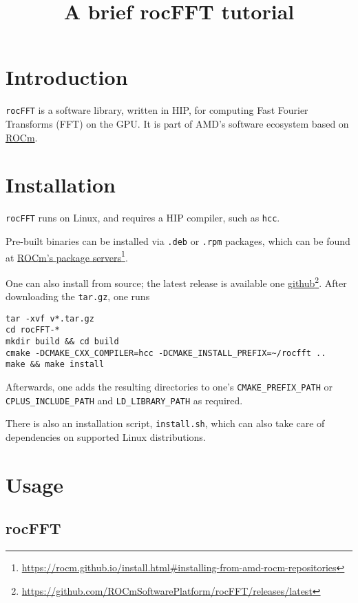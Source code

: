 \documentclass[10pt]{article}
\title{A brief rocFFT tutorial}
\date{}
\renewcommand{\(}{\left(}
\renewcommand{\)}{\right)}
\begin{document}
\maketitle

\section{Introduction}

\texttt{rocFFT} is a software library, written in HIP, for computing
Fast Fourier Transforms (FFT) on the GPU. It is part of AMD's software
ecosystem based on \href{https://github.com/RadeonOpenCompute}{ROCm}.

\section{Installation}

\texttt{rocFFT} runs on Linux, and requires a HIP compiler, such as
\texttt{hcc}.

Pre-built binaries can be installed via \texttt{.deb} or \texttt{.rpm}
packages, which can be found at
\href{https://rocm.github.io/install.html#installing-from-amd-rocm-repositories}{ROCm's
  package servers}\footnote{\url{https://rocm.github.io/install.html\#installing-from-amd-rocm-repositories}}.

One can also install from source; the latest release is available one
\href{https://github.com/ROCmSoftwarePlatform/rocFFT/releases/latest}{github}\footnote{\url{https://github.com/ROCmSoftwarePlatform/rocFFT/releases/latest}}.
After downloading the \texttt{tar.gz}, one runs
\begin{verbatim}
tar -xvf v*.tar.gz
cd rocFFT-*
mkdir build && cd build
cmake -DCMAKE_CXX_COMPILER=hcc -DCMAKE_INSTALL_PREFIX=~/rocfft ..
make && make install
\end{verbatim}
Afterwards, one adds the resulting directories to one's
\texttt{CMAKE_PREFIX_PATH} or \texttt{CPLUS_INCLUDE_PATH} and
\texttt{LD_LIBRARY_PATH} as required.

There is also an installation script, \texttt{install.sh}, which can
also take care of dependencies on supported Linux distributions.

\section{Usage}

\subsection{rocFFT}
\end{document}
